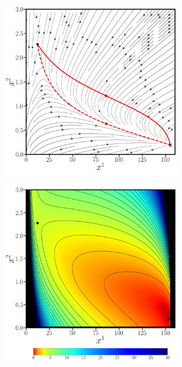 \begin{figure} 
    \centering
     
    \begin{subfigure}[b]{0.4\textwidth}  
        \centering 
        \includegraphics[width=\textwidth]{figs_part1/pyritz/genetic_switch_instanton.png}
        \caption[]%
        {}    
        \label{fig:straight cosserat rod}
    \end{subfigure}
    \hspace{0.4cm}
    \begin{subfigure}[b]{0.4\textwidth}
        \centering
        \includegraphics[width=\textwidth]{figs_part1/pyritz/genetic_switch_quasipotential_from_xb_to_xa.png}

\end{subfigure}
\end{figure}
